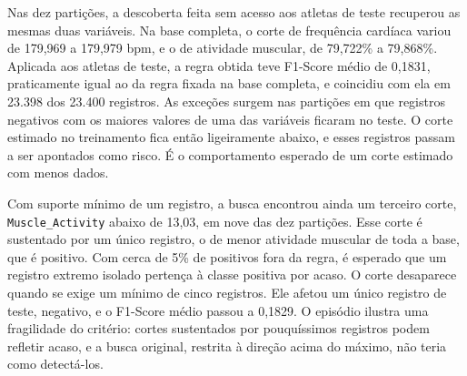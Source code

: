 \begin{table}[H]
\centering
\caption{Regra descoberta no treinamento de cada partição.}
\label{tab:regra_particoes}
\end{table}

Nas dez partições, a descoberta feita sem acesso aos atletas de teste recuperou as mesmas duas variáveis. Na base completa, o corte de frequência cardíaca variou de 179{,}969 a 179{,}979 bpm, e o de atividade muscular, de 79{,}722\% a 79{,}868\%. Aplicada aos atletas de teste, a regra obtida teve F1-Score médio de 0{,}1831, praticamente igual ao da regra fixada na base completa, e coincidiu com ela em 23.398 dos 23.400 registros. As exceções surgem nas partições em que registros negativos com os maiores valores de uma das variáveis ficaram no teste. O corte estimado no treinamento fica então ligeiramente abaixo, e esses registros passam a ser apontados como risco. É o comportamento esperado de um corte estimado com menos dados.

Com suporte mínimo de um registro, a busca encontrou ainda um terceiro corte, \texttt{Muscle\_Activity} abaixo de 13{,}03, em nove das dez partições. Esse corte é sustentado por um único registro, o de menor atividade muscular de toda a base, que é positivo. Com cerca de 5\% de positivos fora da regra, é esperado que um registro extremo isolado pertença à classe positiva por acaso. O corte desaparece quando se exige um mínimo de cinco registros. Ele afetou um único registro de teste, negativo, e o F1-Score médio passou a 0{,}1829. O episódio ilustra uma fragilidade do critério: cortes sustentados por pouquíssimos registros podem refletir acaso, e a busca original, restrita à direção acima do máximo, não teria como detectá-los.

